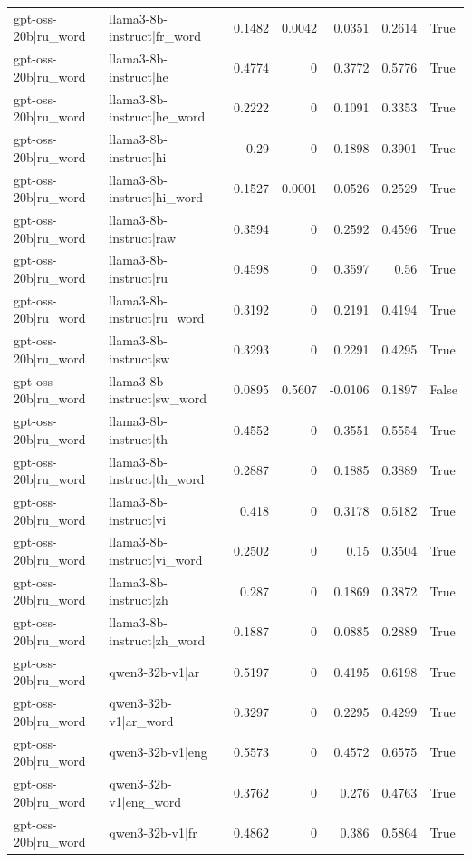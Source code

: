 \begin{table}
\begin{tabular}{l l r r r r l}
gpt-oss-20b|ru_word & llama3-8b-instruct|fr_word & 0.1482 & 0.0042 & 0.0351 & 0.2614 & True \\
gpt-oss-20b|ru_word & llama3-8b-instruct|he & 0.4774 & 0 & 0.3772 & 0.5776 & True \\
gpt-oss-20b|ru_word & llama3-8b-instruct|he_word & 0.2222 & 0 & 0.1091 & 0.3353 & True \\
gpt-oss-20b|ru_word & llama3-8b-instruct|hi & 0.29 & 0 & 0.1898 & 0.3901 & True \\
gpt-oss-20b|ru_word & llama3-8b-instruct|hi_word & 0.1527 & 0.0001 & 0.0526 & 0.2529 & True \\
gpt-oss-20b|ru_word & llama3-8b-instruct|raw & 0.3594 & 0 & 0.2592 & 0.4596 & True \\
gpt-oss-20b|ru_word & llama3-8b-instruct|ru & 0.4598 & 0 & 0.3597 & 0.56 & True \\
gpt-oss-20b|ru_word & llama3-8b-instruct|ru_word & 0.3192 & 0 & 0.2191 & 0.4194 & True \\
gpt-oss-20b|ru_word & llama3-8b-instruct|sw & 0.3293 & 0 & 0.2291 & 0.4295 & True \\
gpt-oss-20b|ru_word & llama3-8b-instruct|sw_word & 0.0895 & 0.5607 & -0.0106 & 0.1897 & False \\
gpt-oss-20b|ru_word & llama3-8b-instruct|th & 0.4552 & 0 & 0.3551 & 0.5554 & True \\
gpt-oss-20b|ru_word & llama3-8b-instruct|th_word & 0.2887 & 0 & 0.1885 & 0.3889 & True \\
gpt-oss-20b|ru_word & llama3-8b-instruct|vi & 0.418 & 0 & 0.3178 & 0.5182 & True \\
gpt-oss-20b|ru_word & llama3-8b-instruct|vi_word & 0.2502 & 0 & 0.15 & 0.3504 & True \\
gpt-oss-20b|ru_word & llama3-8b-instruct|zh & 0.287 & 0 & 0.1869 & 0.3872 & True \\
gpt-oss-20b|ru_word & llama3-8b-instruct|zh_word & 0.1887 & 0 & 0.0885 & 0.2889 & True \\
gpt-oss-20b|ru_word & qwen3-32b-v1|ar & 0.5197 & 0 & 0.4195 & 0.6198 & True \\
gpt-oss-20b|ru_word & qwen3-32b-v1|ar_word & 0.3297 & 0 & 0.2295 & 0.4299 & True \\
gpt-oss-20b|ru_word & qwen3-32b-v1|eng & 0.5573 & 0 & 0.4572 & 0.6575 & True \\
gpt-oss-20b|ru_word & qwen3-32b-v1|eng_word & 0.3762 & 0 & 0.276 & 0.4763 & True \\
gpt-oss-20b|ru_word & qwen3-32b-v1|fr & 0.4862 & 0 & 0.386 & 0.5864 & True \\

\end{tabular}
\end{table}
